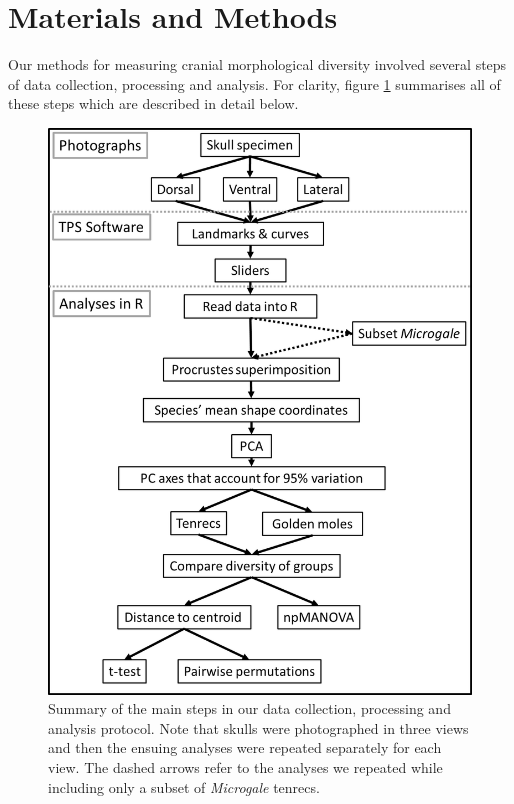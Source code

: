 \documentclass[12pt,a4paper]{article}
\begin{document}
\section{Materials and Methods}

	Our methods for measuring cranial morphological diversity involved several steps of data collection, processing and analysis. For clarity,  figure \ref{fig:flow} summarises all of these steps which are described in detail below.   
	
		\begin{figure}
		\centering
		\includegraphics[width=1\linewidth]{figures/Methods_flowchart.png}
		
		\caption[Flowchart diagram of data collection and analysis]
			{Summary of the main steps in our data collection, processing and analysis protocol. Note that skulls were photographed in three views and then the ensuing analyses were repeated separately for each view. The dashed arrows refer to the analyses we repeated while including only a subset of \textit{Microgale} tenrecs.}
		
		\label{fig:flow}
		\end{figure}
	
\end{document}
